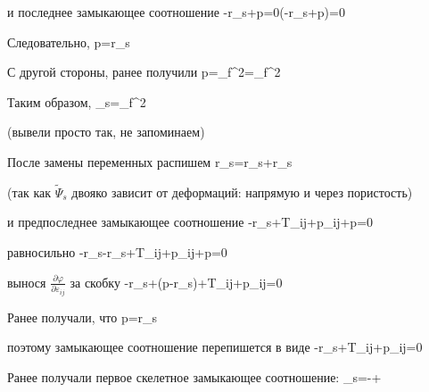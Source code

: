 \documentclass[main.tex]{subfiles}
\begin{document}
и последнее замыкающее соотношение
\beq
-r_s+p=0\Leftrightarrow \left(-r_s+p\right)=0
\eeq

Следовательно,
\beq
p=r_s
\eeq

С другой стороны, ранее получили
\beq
p=\rho_f^2=\rho_f^2
\eeq

Таким образом,
\beq
\varphi\rho_s=\rho_f^2
\eeq

(вывели просто так, не запоминаем)

После замены переменных распишем 
\beq
r_s=r_s+r_s
\eeq

(так как $\tilde{\Psi}_s$ двояко зависит от деформаций: напрямую и через пористость)

и предпоследнее замыкающее соотношение
\beq
-r_s+T_{ij}+p\varphi\delta_{ij}+p=0
\eeq

равносильно
\beq
-r_s-r_s+T_{ij}+p\varphi\delta_{ij}+p=0
\eeq

вынося $\displaystyle{}\frac{\partial\varphi}{\partial\varepsilon_{ij}}$ за скобку
\beq
-r_s+\left(p-r_s\right)+T_{ij}+p\varphi\delta_{ij}=0
\eeq

Ранее получали, что
\beq
p=r_s
\eeq

поэтому замыкающее соотношение перепишется в виде
\beq
-r_s+T_{ij}+p\varphi\delta_{ij}=0
\eeq

Ранее получали первое скелетное замыкающее соотношение:
\beq
\eta_s=-+\frac{\partial\varphi}{\partial\theta}
\eeq
\end{document}
